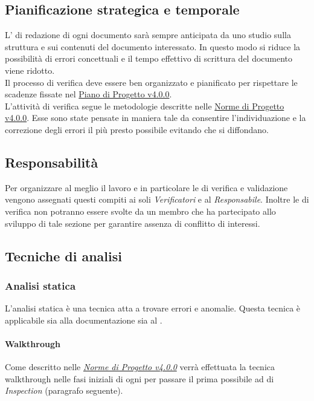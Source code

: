 \documentclass{scalatekids-article}
\begin{document}
\subsection{Pianificazione strategica e temporale}
L' di redazione di ogni documento sarà sempre anticipata da uno studio sulla struttura e sui contenuti del documento interessato. In questo modo si riduce la possibilità di errori concettuali e il tempo effettivo di scrittura del documento viene ridotto.\\
Il processo di verifica deve essere ben organizzato e pianificato per rispettare le scadenze fissate nel \href{run:./PianoDiProgetto\_v4.0.0.pdf}{Piano di Progetto v4.0.0}.\\
L'attività di verifica segue le metodologie descritte nelle \href{run:../Interni/NormeDiProgetto\_v4.0.0.pdf}{Norme di Progetto v4.0.0}. Esse sono state pensate in maniera tale da consentire l'individuazione e la correzione degli errori il più presto possibile evitando che si diffondano.
\subsection{Responsabilità}
Per organizzare al meglio il lavoro e in particolare le  di verifica e validazione vengono assegnati questi compiti ai soli \textit{Verificatori} e al \textit{Responsabile}. Inoltre le  di verifica non potranno essere svolte da un membro che ha partecipato allo sviluppo di tale sezione per garantire assenza di conflitto di interessi.
\subsection{Tecniche di analisi}
\label{sec:TecnicheDiAnalisi}
\subsubsection{Analisi statica}
L'analisi statica è una tecnica atta a trovare errori e anomalie. Questa tecnica è applicabile sia alla documentazione sia al .
\paragraph{Walkthrough}
\label{sec:walkthrough}Come descritto nelle \textit{\href{run:../Interni/NormeDiProgetto_v4.0.0.pdf}{Norme di Progetto v4.0.0}} verrà effettuata la tecnica walkthrough nelle fasi iniziali di ogni  per passare il prima possibile ad  di \textit{Inspection} (paragrafo seguente).
\end{document}
